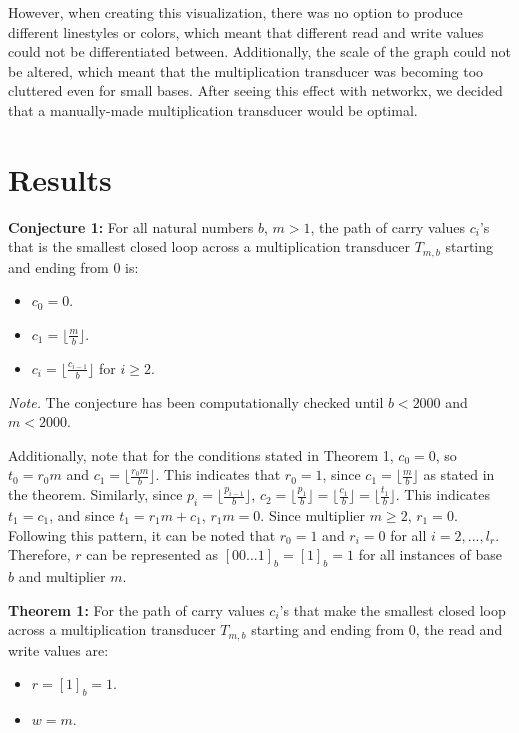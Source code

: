 \documentclass{article}
\begin{document}
However, when creating this visualization, there was no option to produce different linestyles or colors, which meant that different read and write values could not be differentiated between. Additionally, the scale of the graph could not be altered, which meant that the multiplication transducer was becoming too cluttered even for small bases. After seeing this effect with networkx, we decided that a manually-made multiplication transducer would be optimal.

\section{Results}

\textbf{Conjecture 1:} For all natural numbers $b$, $m > 1$, the path of carry values $c_i$'s that is the smallest closed loop across a multiplication transducer $T_{m,b}$ starting and ending from $0$ is:
\begin{itemize}
  \item $c_0 = 0$.
  \item $c_1 = \lfloor{\frac{m}{b}}\rfloor$.
  \item $c_i = \lfloor{\frac{c_{i-1}}{b}}\rfloor$ for $i \geq 2$.
\end{itemize}
\textit{Note.} The conjecture has been computationally checked until $b < 2000$ and $m < 2000$. \vspace{\baselineskip}

\noindent
Additionally, note that for the conditions stated in Theorem 1, $c_0 = 0$, so $t_0 = r_0m$ and $c_1 = \lfloor{\frac{r_0m}{b}}\rfloor$. This indicates that $r_0 = 1$, since $c_1 = \lfloor{\frac{m}{b}}\rfloor$ as stated in the theorem. Similarly, since $p_i = \lfloor{\frac{p_{i-1}}{b}}\rfloor$, $c_2 = \lfloor{\frac{p_1}{b}}\rfloor = \lfloor{\frac{c_1}{b}}\rfloor = \lfloor{\frac{t_1}{b}}\rfloor$. This indicates $t_1 = c_1$, and since $t_1 = r_1m + c_1$, $r_1m = 0$. Since multiplier $m \geq 2$, $r_1 = 0$. Following this pattern, it can be noted that $r_0 = 1$ and $r_i = 0$ for all $i = 2, ..., l_r$. Therefore, $r$ can be represented as $[00...1]_b = [1]_b = 1$ for all instances of base $b$ and multiplier $m$. \vspace{\baselineskip}

\noindent
\textbf{Theorem 1:} For the path of carry values $c_i$'s that make the smallest closed loop across a multiplication transducer $T_{m,b}$ starting and ending from $0$, the read and write values are:
\begin{itemize}
  \item $r = [1]_b = 1$.
  \item $w = m$.
\end{itemize}
\end{document}

